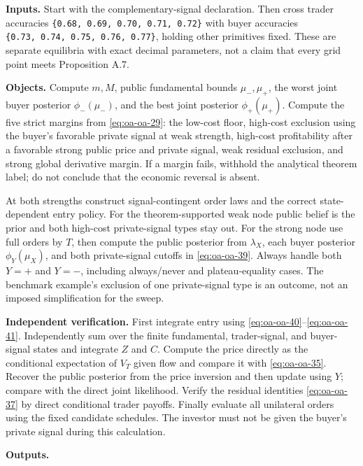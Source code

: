 \documentclass[
  11pt,
]{article}
\begin{document}
\textbf{Inputs.} Start with the complementary-signal declaration. Then
cross trader accuracies \texttt{\{0.68,\ 0.69,\ 0.70,\ 0.71,\ 0.72\}}
with buyer accuracies \texttt{\{0.73,\ 0.74,\ 0.75,\ 0.76,\ 0.77\}},
holding other primitives fixed. These are separate equilibria with exact
decimal parameters, not a claim that every grid point meets Proposition
A.7.

\textbf{Objects.} Compute \(m,M\), public fundamental bounds
\(\mu_-,\mu_+\), the worst joint buyer posterior \(\phi_-(\mu_-)\), and
the best joint posterior \(\phi_+(\mu_+)\). Compute the five strict
margins from \eqref{eq:oa-oa-29}: the low-cost floor, high-cost
exclusion using the buyer's favorable private signal at weak strength,
high-cost profitability after a favorable strong public price and
private signal, weak residual exclusion, and strong global derivative
margin. If a margin fails, withhold the analytical theorem label; do not
conclude that the economic reversal is absent.

At both strengths construct signal-contingent order laws and the correct
state-dependent entry policy. For the theorem-supported weak node public
belief is the prior and both high-cost private-signal types stay out.
For the strong node use full orders by \(T\), then compute the public
posterior from \(\lambda_X\), each buyer posterior \(\phi_Y(\mu_X)\),
and both private-signal cutoffs in \eqref{eq:oa-oa-39}. Always handle
both \(Y=+\) and \(Y=-\), including always/never and plateau-equality
cases. The benchmark example's exclusion of one private-signal type is
an outcome, not an imposed simplification for the sweep.

\textbf{Independent verification.} First integrate entry using
\eqref{eq:oa-oa-40}--\eqref{eq:oa-oa-41}. Independently sum over the
finite fundamental, trader-signal, and buyer-signal states and integrate
\(Z\) and \(C\). Compute the price directly as the conditional
expectation of \(V_T\) given flow and compare it with
\eqref{eq:oa-oa-35}. Recover the public posterior from the price
inversion and then update using \(Y\); compare with the direct joint
likelihood. Verify the residual identities \eqref{eq:oa-oa-37} by direct
conditional trader payoffs. Finally evaluate all unilateral orders using
the fixed candidate schedules. The investor must not be given the
buyer's private signal during this calculation.

\textbf{Outputs.}
\end{document}
